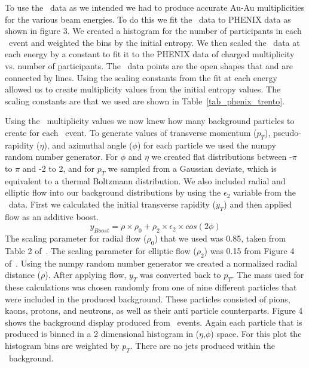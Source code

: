 \documentclass[11pt]{article}
\begin{document}
To use the \trento\ data as we intended we had to produce accurate Au-Au multiplicities for the various beam energies. To do this we fit the \trento\ data to PHENIX data as shown in figure 3.  We created a histogram for the number of participants in each \trento\ event and weighted the bins by the initial entropy. We then scaled the \trento\ data at each energy by a constant to fit it to the PHENIX data of charged multiplicity vs. number of participants. The \trento\ data points are the open shapes that and are connected by lines. Using the scaling constants from the fit at each energy allowed us to create multiplicity values from the initial entropy values. The scaling constants are that we used are shown in Table~\ref{tab_phenix_trento}.

Using the \trento\ multiplicity values we now knew how many background particles to create for each \trento\ event. To generate values of transverse momentum ($p_T$), pseudo-rapidity ($\eta$), and azimuthal angle ($\phi$) for each particle we used the numpy random number generator. For $\phi$  and $\eta$ we created flat distributions between -$\pi$ to $\pi$ and -2 to 2, and for $p_T$ we sampled from a Gaussian deviate, which is equivalent to a thermal Boltzmann distribution. We also included radial and elliptic flow into our background distributions by using the $\epsilon_2$ variable from the \trento\ data. First we calculated the initial transverse rapidity ($y_T$) and then applied flow as an additive boost. 
\[y_{Boost} = \rho \times \rho_0 + \rho_2 \times \epsilon_2 \times cos(2\phi)\]
The scaling parameter for radial flow ($\rho_0$) that we used was 0.85, taken from Table 2 of~\cite{Retiere:2004hn}.  The scaling parameter for elliptic flow ($\rho_2$) was 0.15 from Figure 4 of~\cite{Alver:2010do}.  Using the numpy random number generator we created a normalized radial distance ($\rho$). After applying flow, $y_T$ was converted back to $p_T$. The mass used for these calculations was chosen randomly from one of nine different particles that were included in the produced background. These particles consisted of pions, kaons, protons, and neutrons, as well as their anti particle counterparts. Figure 4 shows the background display produced from \trento\ events. Again each particle that is produced is binned in a 2 dimensional histogram in ($\eta$,$\phi$) space. For this plot the histogram bins are weighted by $p_T$. There are no jets produced within the \trento\ background.
\end{document}

